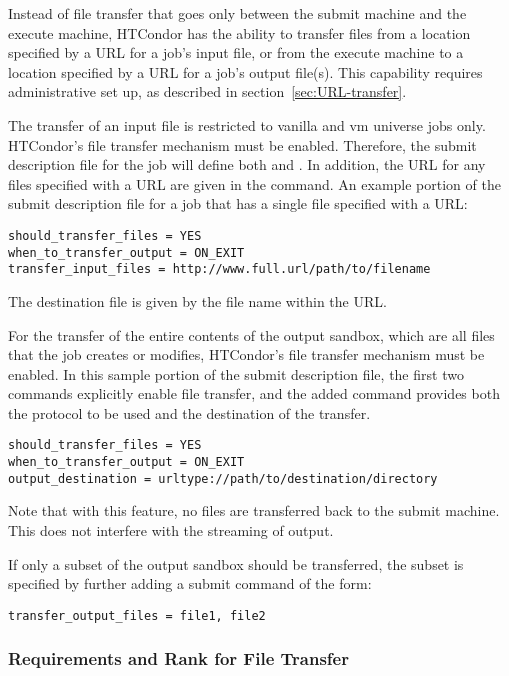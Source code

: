 Instead of file transfer that goes only between the submit machine
and the execute machine,
HTCondor has the ability to transfer files from a location specified
by a URL for a job's input file,
or from the execute machine to a location specified by a URL
for a job's output file(s).
This capability requires administrative set up, 
as described in section~\ref{sec:URL-transfer}.

The transfer of an input file is restricted to
vanilla and vm universe jobs only.
HTCondor's file transfer mechanism must be enabled.
Therefore, the submit description file for the job will define both
 and .
In addition, the URL for any files specified with a URL are
given in the  command.
An example portion of the submit description file for a job
that has a single file specified with a URL:

\footnotesize
\begin{verbatim}
should_transfer_files = YES
when_to_transfer_output = ON_EXIT
transfer_input_files = http://www.full.url/path/to/filename
\end{verbatim}
\normalsize

The destination file is given by the file name within the URL. 

For the transfer of the entire contents of the output sandbox,
which are all files that the job creates or modifies,
HTCondor's file transfer mechanism must be enabled.
In this sample portion of the submit description file,
the first two commands explicitly enable file transfer,
and the added  command provides
both the protocol to be used and the destination of the transfer.
\footnotesize
\begin{verbatim}
should_transfer_files = YES
when_to_transfer_output = ON_EXIT
output_destination = urltype://path/to/destination/directory
\end{verbatim}
\normalsize
Note that with this feature, no files are transferred back to the 
submit machine.  
This does not interfere with the streaming of output. 

If only a subset of the output sandbox should be transferred,
the subset is specified by further adding a submit command of the form:
\footnotesize
\begin{verbatim}
transfer_output_files = file1, file2
\end{verbatim}
\normalsize

\subsubsection{Requirements and Rank for File Transfer}

